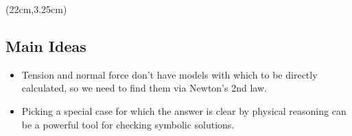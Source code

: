 \documentclass[]{article}
\begin{document}
\begin{PresentSpace}
\begin{itemize}
\begin{comment}
		\item Does our symbolic answer for the case match what the answer should be?
	\end{itemize}
	\item What if the table were vertical?
	\begin{itemize}
		\item How big \textbf{should} each force be?
		\item What angle corresponds to this \textbf{case}?
		\item Does our symbolic answer for the case match what the answer should be?
	\end{itemize}
	\end{comment}
\end{itemize}
\end{PresentSpace}
\begin{textblock*}{5cm}(22cm,3.25cm)
\centering
{}
\end{textblock*}
\newpage
\begin{TeacherMargin}
	
\end{TeacherMargin}
\begin{PresentSpace}
\section*{Main Ideas}
\begin{itemize}
	\item Tension and normal force don't have models with which to be directly calculated, so we need to find them via Newton's 2nd law.
	\item Picking a special case for which the answer is clear by physical reasoning can be a powerful tool for checking symbolic solutions.
\end{itemize}
\end{PresentSpace}
\end{document}
